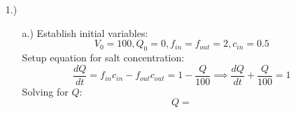 \documentclass[12pt]{article}
\begin{document}
\pagestyle{fancy}
\fancyhead{}

\begin{itemize}
    \item [1.)] \begin{itemize}
        \item [a.)] Establish initial variables:
        \[V_0=100,Q_0=0,f_{in}=f_{out}=2,c_{in}=0.5\]
        Setup equation for salt concentration:
        \[\dfrac{dQ}{dt}=f_{in}c_{in}-f_{out}c_{out}=1-\dfrac{Q}{100}\implies\dfrac{dQ}{dt}+\dfrac{Q}{100}=1\]
        Solving for $Q$:
        \[Q=\]
    \end{itemize}
\end{itemize}
\end{document}
